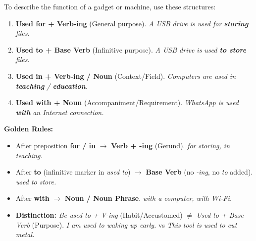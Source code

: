 \documentclass[11pt]{article}
\begin{document}
\begin{methode}
To describe the function of a gadget or machine, use these structures:
\begin{enumerate}
\item \textbf{Used for + Verb-ing} (General purpose). \emph{A USB drive is used for \textbf{storing} files.}
\item \textbf{Used to + Base Verb} (Infinitive purpose). \emph{A USB drive is used \textbf{to store} files.}
\item \textbf{Used in + Verb-ing / Noun} (Context/Field). \emph{Computers are used in \textbf{teaching} / \textbf{education}.}
\item \textbf{Used with + Noun} (Accompaniment/Requirement). \emph{WhatsApp is used \textbf{with} an Internet connection.}
\end{enumerate}
\textbf{Golden Rules:}
\begin{itemize}
\item After preposition \textbf{for / in} $\rightarrow$ \textbf{Verb + -ing} (Gerund). \emph{for storing, in teaching.}
\item After \textbf{to} (infinitive marker in \emph{used to}) $\rightarrow$ \textbf{Base Verb} (no \emph{-ing}, no \emph{to} added). \emph{used to store.}
\item After \textbf{with} $\rightarrow$ \textbf{Noun / Noun Phrase}. \emph{with a computer, with Wi-Fi.}
\item \textbf{Distinction:} \emph{Be used to + V-ing} (Habit/Accustomed) $\neq$ \emph{Used to + Base Verb} (Purpose). \emph{I am used to waking up early.} vs \emph{This tool is used to cut metal.}
\end{itemize}
\end{methode}
\end{document}

